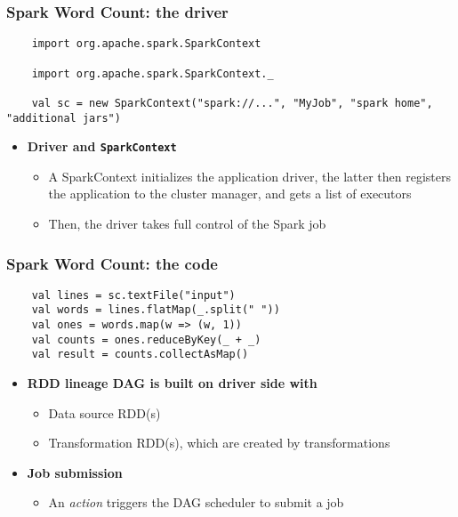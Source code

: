 \begin{frame}[fragile] 
\frametitle{Spark Word Count: the driver}
\begin{lstlisting}
	import org.apache.spark.SparkContext

	import org.apache.spark.SparkContext._

	val sc = new SparkContext("spark://...", "MyJob", "spark home", "additional jars") 
\end{lstlisting}

\begin{itemize}
	\item {\bf Driver and \texttt{SparkContext}}
	\begin{itemize}
		\item A SparkContext initializes the application driver, the latter then registers the application to the cluster manager, and gets a list of executors
		\item Then, the driver takes full control of the Spark job
	\end{itemize}
\end{itemize}

\end{frame}

\begin{frame}[fragile] 
\frametitle{Spark Word Count: the code}
\begin{lstlisting}
	val lines = sc.textFile("input")
	val words = lines.flatMap(_.split(" ")) 
	val ones = words.map(w => (w, 1))
	val counts = ones.reduceByKey(_ + _) 
	val result = counts.collectAsMap()
\end{lstlisting}

\begin{itemize}
	\item {\bf RDD lineage DAG is built on driver side with}
	\begin{itemize}
		\item Data source RDD(s)
		\item Transformation RDD(s), which are created by transformations
	\end{itemize}

	\vspace{10pt}

	\item {\bf Job submission}
	\begin{itemize}
		\item An \emph{action} triggers the DAG scheduler to submit a job
	\end{itemize}
\end{itemize}

\end{frame}


